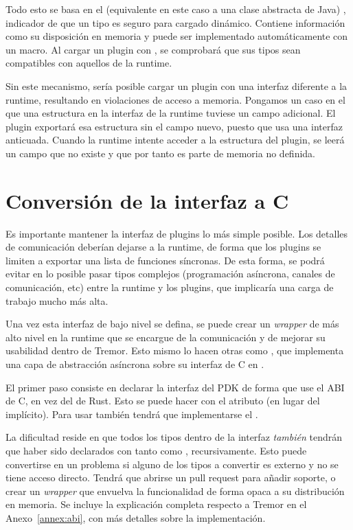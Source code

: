 Todo esto se basa en el \trait (equivalente en este caso a una clase abstracta
de Java) , indicador de que un tipo es seguro para cargado
dinámico. Contiene información como su disposición en memoria y puede ser
implementado automáticamente con un macro. Al cargar un plugin con \abistable,
se comprobará que sus tipos sean compatibles con aquellos de la runtime.

Sin este mecanismo, sería posible cargar un plugin con una interfaz diferente a
la runtime, resultando en violaciones de acceso a memoria. Pongamos un caso en
el que una estructura en la interfaz de la runtime tuviese un campo adicional.
El plugin exportará esa estructura sin el campo nuevo, puesto que usa una
interfaz anticuada. Cuando la runtime intente acceder a la estructura del
plugin, se leerá un campo que no existe y que por tanto es parte de memoria no
definida.

\section{Conversión de la interfaz a C}

Es importante mantener la interfaz de plugins lo más simple posible. Los
detalles de comunicación deberían dejarse a la runtime, de forma que los plugins
se limiten a exportar una lista de funciones síncronas. De esta forma, se podrá
evitar en lo posible pasar tipos complejos (programación asíncrona, canales de
comunicación, etc) entre la runtime y los plugins, que implicaría una carga de
trabajo mucho más alta.

Una vez esta interfaz de bajo nivel se defina, se puede crear un \emph{wrapper}
de más alto nivel en la runtime que se encargue de la comunicación y de mejorar
su usabilidad dentro de Tremor. Esto mismo lo hacen otras \crates como
, que implementa una capa de abstracción asíncrona sobre su
interfaz de C en .

El primer paso consiste en declarar la interfaz del PDK de forma que use el ABI
de C, en vez del de Rust. Esto se puede hacer con el atributo \rust{#[repr(C)]}
(en lugar del  implícito). Para usar \abistable también
tendrá que implementarse el \trait {}.

La dificultad reside en que todos los tipos dentro de la interfaz \emph{también}
tendrán que haber sido declarados con tanto \rust{#[repr(C)]} como
, recursivamente. Esto puede convertirse en un problema si
alguno de los tipos a convertir es externo y no se tiene acceso directo. Tendrá
que abrirse un pull request para añadir soporte, o crear un \emph{wrapper} que
envuelva la funcionalidad de forma opaca a su distribución en memoria. Se
incluye la explicación completa respecto a Tremor en el Anexo~\ref{annex:abi},
con más detalles sobre la implementación.

